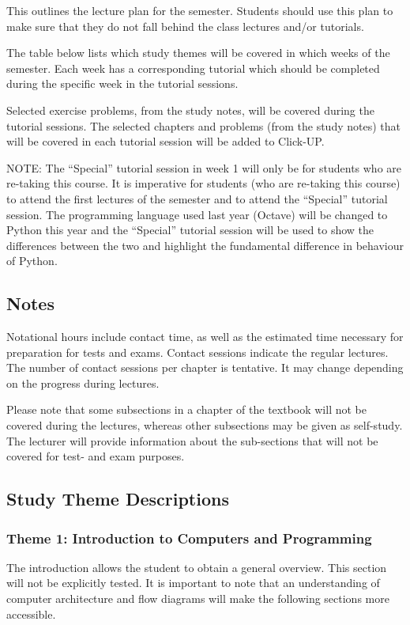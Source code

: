         This outlines the lecture plan for the semester. Students should use
        this plan to make sure that they do not fall behind the class
        lectures and/or tutorials.

        The table below lists which study themes will be covered in which weeks
        of the semester. Each week has a corresponding tutorial which should
        be completed during the specific week in the tutorial sessions.
        
        Selected exercise problems, from the study notes, will be covered during 
        the tutorial sessions. The selected chapters and problems (from the study
        notes) that will be covered in each tutorial session will be added to 
        Click-UP.
        
        NOTE: The ``Special'' tutorial session in week 1 will only be for students
        who are re-taking this course. It is imperative for students (who are 
        re-taking this course) to attend the first lectures of the semester and to 
        attend the ``Special'' tutorial session. The programming language used
        last year (Octave) will be changed to Python this year and the ``Special''
        tutorial session will be used to show the differences between the two
        and highlight the fundamental difference in behaviour of Python.
        
    \subsection{Notes}
        Notational hours include contact time, as well as the estimated time 
        necessary for preparation for tests and exams. Contact sessions indicate
        the regular lectures. The number of contact sessions per chapter is 
        tentative. It may change depending on the progress during lectures.
        
        Please note that some subsections in a chapter of the textbook will not be
        covered during the lectures, whereas other subsections may be given as 
        self-study. The lecturer will provide information about the sub-sections
        that will not be covered for test- and exam purposes.
    
    
    \subsection{Study Theme Descriptions}
        \subsubsection{Theme 1: Introduction to Computers and Programming}
            The introduction allows the student to obtain a general overview. 
            This section will not be explicitly tested. It is important to note
            that an understanding of computer architecture and flow diagrams
            will make the following sections more accessible.


